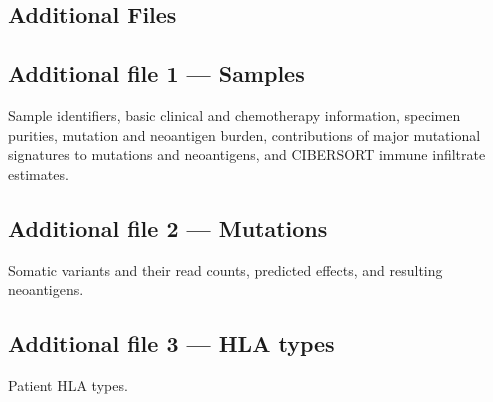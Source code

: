\documentclass[linenumbers]{bmcart}
\begin{document}
\begin{backmatter}



\section*{Additional Files}
  \subsection*{Additional file 1 --- Samples}
    Sample identifiers, basic clinical and chemotherapy information, specimen purities, mutation and neoantigen burden, contributions of major mutational signatures to mutations and neoantigens, and CIBERSORT immune infiltrate estimates.

  \subsection*{Additional file 2 --- Mutations}
    Somatic variants and their read counts, predicted effects, and resulting neoantigens.
  
  \subsection*{Additional file 3 --- HLA types}
    Patient HLA types.
    

\end{backmatter}
\end{document}
